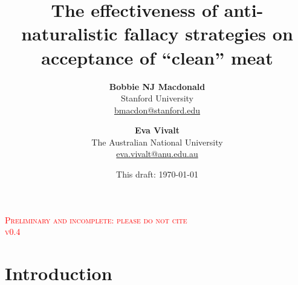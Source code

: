 \documentclass[12pt]{article}
\title{
    \vspace{-8mm}
    \Huge\selectfont\textbf{The effectiveness of anti-naturalistic fallacy strategies on acceptance of ``clean'' meat} \\[5mm] 
    \vspace{5mm}
}
\author{\textbf{Bobbie NJ Macdonald} \\
        Stanford University \\
        {\href{mailto:bmacdon@stanford.edu}{bmacdon@stanford.edu}} \\
    \and \textbf{Eva Vivalt} \\
        The Australian National University \\
        {\href{mailto:eva.vivalt@anu.edu.au}{eva.vivalt@anu.edu.au}} \\
}
\date{This draft: \today{}}
\newcommand{\todo}[1]{\textit{\textcolor{red}{$<$todo$>$ #1 $<$/todo$>$}}}
\begin{document}
\maketitle
\thispagestyle{empty}

\begin{centering}
    \Large \textsc{\textcolor{red}{Preliminary and incomplete: please do not cite}} \\
    \Large \textsc{\textcolor{red}{v0.4}} \\
    \vspace{10mm}
\end{centering}







\setcounter{page}{1}

\section{Introduction}
\label{sec:intro}

\end{document}
